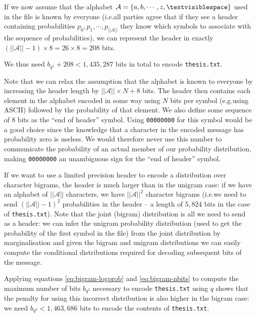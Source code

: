 \documentclass[10pt,a4paper,oneside,onecolumn]{article}
\makeatletter
\newcommand*{\thesisTXT}{{\tt thesis.txt}\xspace}
\newcommand*{\eg}{e.g.\@}
\newcommand*{\ie}{i.e.\@}
\newcommand*{\norm}[1]{\ensuremath{\left|\left|#1\right|\right|}}
\newcommand*{\lbr}{\ensuremath{\left\{}}
\newcommand*{\rbr}{\ensuremath{\right\}}}
\makeatother
\begin{document}
If we now assume that the alphabet $\mathcal{A} = \lbr a, b, \cdots, z,
\textvisiblespace \rbr$ used in the file is known by everyone (\ie all parties
agree that if they see a header containing probabilities $p_0, p_1, \cdots,
p_{\norm{\mathcal{A}}}$ they know which symbols to associate with the sequence
of probabilities), we can represent the header in exactly $(\norm{\mathcal{A}} -
1) \times 8 = 26 \times 8 = 208$ bits.\footnotemark

We thus need $b_{q^1} + 208 < 1,435,287$ bits in total to encode \thesisTXT.


Note that we can relax the assumption that the alphabet is known to everyone by
increasing the header length by $\norm{\mathcal{A}} \times N + 8$ bits. The
header then contains each element in the alphabet encoded in some way using $N$
bits per symbol (\eg using ASCII) followed by the probability of that element.
We also define some sequence of 8 bits as the ``end of header'' symbol. Using
{\tt 00000000} for this symbol would be a good choice since the knowledge that a
character in the encoded message has probability zero is useless. We would
therefore never use this number to communicate the probability of an actual
member of our probability distribution, making {\tt 00000000} an unambiguous
sign for the ``end of header'' symbol.

If we want to use a limited precision header to encode a distribution over
character bigrams, the header is much larger than in the unigram case: if we
have an alphabet of $\norm{\mathcal{A}}$ characters, we have
$\norm{\mathcal{A}}^2$ character bigrams (\ie we need to send
$(\norm{\mathcal{A}} - 1)^2$ probabilities in the header -- a length of $5,824$
bits in the case of \thesisTXT). Note that the joint (bigram) distribution is
all we need to send as a header: we can infer the unigram probability
distribution (used to get the probability of the first symbol in the file) from
the joint distribution by marginalisation and given the bigram and unigram
distributions we can easily compute the conditional distributions required for
decoding subsequent bits of the message.

Applying equations \eqref{eq:bigram-logprob} and \eqref{eq:bigram-nbits} to
compute the maximum number of bits $b_{q^2}$ necessary to encode \thesisTXT
using $q$ shows that the penalty for using this incorrect distribution is also
higher in the bigram case: we need $b_{q^2} < 1,463,686$ bits to encode the
contents of \thesisTXT\@.
\end{document}

